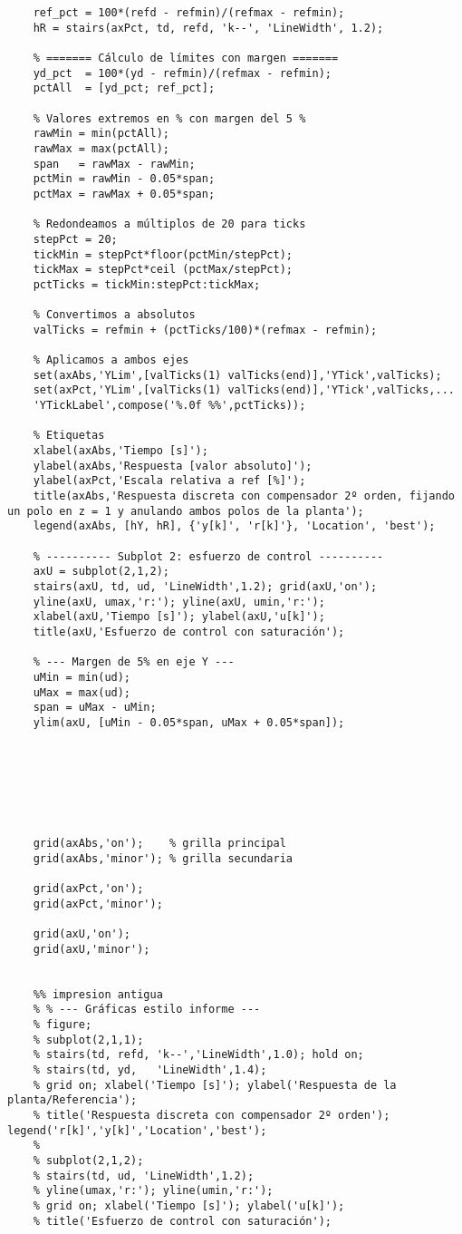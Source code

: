 \begin{lstlisting}[style=matlabstyle,caption={Primera hoja de cálculos utilizada.},label={matlab:calculo1}]
	% r[k] en negro, graficado en %
	ref_pct = 100*(refd - refmin)/(refmax - refmin);
	hR = stairs(axPct, td, refd, 'k--', 'LineWidth', 1.2);
	
	% ======= Cálculo de límites con margen =======
	yd_pct  = 100*(yd - refmin)/(refmax - refmin);
	pctAll  = [yd_pct; ref_pct];
	
	% Valores extremos en % con margen del 5 %
	rawMin = min(pctAll);
	rawMax = max(pctAll);
	span   = rawMax - rawMin;
	pctMin = rawMin - 0.05*span;
	pctMax = rawMax + 0.05*span;
	
	% Redondeamos a múltiplos de 20 para ticks
	stepPct = 20;
	tickMin = stepPct*floor(pctMin/stepPct);
	tickMax = stepPct*ceil (pctMax/stepPct);
	pctTicks = tickMin:stepPct:tickMax;
	
	% Convertimos a absolutos
	valTicks = refmin + (pctTicks/100)*(refmax - refmin);
	
	% Aplicamos a ambos ejes
	set(axAbs,'YLim',[valTicks(1) valTicks(end)],'YTick',valTicks);
	set(axPct,'YLim',[valTicks(1) valTicks(end)],'YTick',valTicks,...
	'YTickLabel',compose('%.0f %%',pctTicks));
	
	% Etiquetas
	xlabel(axAbs,'Tiempo [s]');
	ylabel(axAbs,'Respuesta [valor absoluto]');
	ylabel(axPct,'Escala relativa a ref [%]');
	title(axAbs,'Respuesta discreta con compensador 2º orden, fijando un polo en z = 1 y anulando ambos polos de la planta');
	legend(axAbs, [hY, hR], {'y[k]', 'r[k]'}, 'Location', 'best');
	
	% ---------- Subplot 2: esfuerzo de control ----------
	axU = subplot(2,1,2);
	stairs(axU, td, ud, 'LineWidth',1.2); grid(axU,'on');
	yline(axU, umax,'r:'); yline(axU, umin,'r:');
	xlabel(axU,'Tiempo [s]'); ylabel(axU,'u[k]');
	title(axU,'Esfuerzo de control con saturación');
	
	% --- Margen de 5% en eje Y ---
	uMin = min(ud);
	uMax = max(ud);
	span = uMax - uMin;
	ylim(axU, [uMin - 0.05*span, uMax + 0.05*span]);
	
	
	
	
	
	
	
	grid(axAbs,'on');    % grilla principal
	grid(axAbs,'minor'); % grilla secundaria
	
	grid(axPct,'on');
	grid(axPct,'minor');
	
	grid(axU,'on');
	grid(axU,'minor');
	
	
	%% impresion antigua
	% % --- Gráficas estilo informe ---
	% figure; 
	% subplot(2,1,1);
	% stairs(td, refd, 'k--','LineWidth',1.0); hold on;
	% stairs(td, yd,   'LineWidth',1.4);
	% grid on; xlabel('Tiempo [s]'); ylabel('Respuesta de la planta/Referencia');
	% title('Respuesta discreta con compensador 2º orden'); legend('r[k]','y[k]','Location','best');
	% 
	% subplot(2,1,2);
	% stairs(td, ud, 'LineWidth',1.2);
	% yline(umax,'r:'); yline(umin,'r:');
	% grid on; xlabel('Tiempo [s]'); ylabel('u[k]');
	% title('Esfuerzo de control con saturación');
\end{lstlisting}

